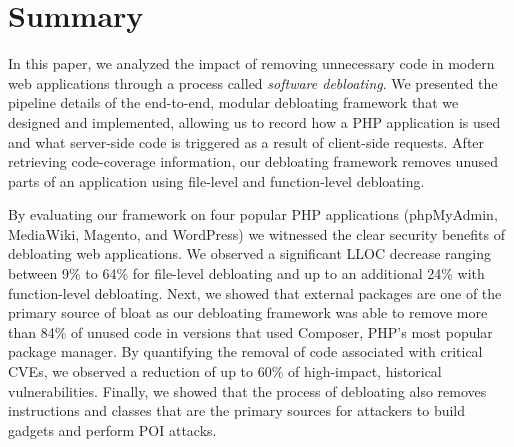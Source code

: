 \section{Summary}

In this paper, we analyzed the impact of removing unnecessary code in modern
web applications through a process called \textit{software debloating}.
We presented the pipeline details of the end-to-end, modular debloating
framework that we designed and implemented, allowing us to record how a
PHP application is used and what server-side code is triggered as a result of
client-side requests. After retrieving code-coverage information, our debloating
framework removes unused parts of
an application using file-level and function-level debloating.

By evaluating
our framework on four popular PHP applications (phpMyAdmin, MediaWiki,
Magento, and WordPress) we witnessed the clear security benefits of debloating web
applications. We observed a significant LLOC decrease ranging between
9\% to 64\% for file-level debloating and up to an additional 24\% with
function-level debloating. Next, we showed that external packages are one
of the primary source of bloat as our debloating framework was able to remove
more than 84\% of unused code in versions that used Composer, PHP's most popular
package manager. By quantifying the removal of code associated with critical
CVEs, we observed a reduction of up to 60\% of high-impact, historical vulnerabilities.
Finally, we showed that the process of debloating also removes
instructions and classes that are the primary sources for attackers to build
gadgets and perform POI attacks.

